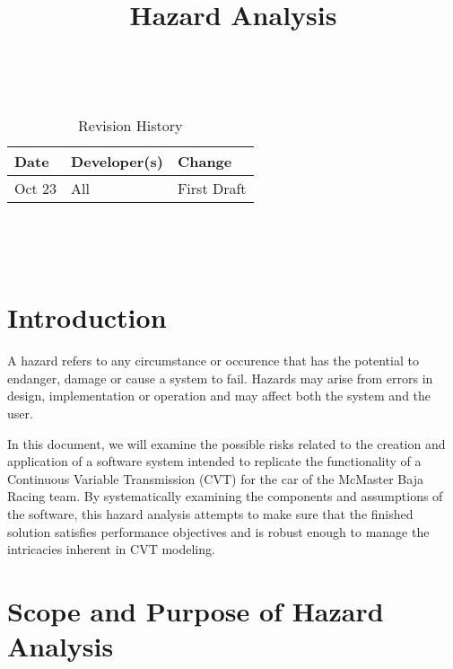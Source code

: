 \documentclass{article}
\title{Hazard Analysis\\\progname}
\author{\authname}
\date{}
\begin{document}
\maketitle
\thispagestyle{empty}

~\newpage


\begin{table}[hp]
\caption{Revision History} \label{TblRevisionHistory}
\begin{tabularx}{\textwidth}{llX}
\toprule
\textbf{Date} & \textbf{Developer(s)} & \textbf{Change}\\
\midrule
Oct 23 & All & First Draft\\
\bottomrule
\end{tabularx}
\end{table}

~\newpage

\tableofcontents

~\newpage


\section{Introduction}

A hazard refers to any circumstance or occurence that has the potential to endanger, damage or cause a system to fail. Hazards may arise from errors in design, implementation or operation and may affect both the system and the user.

In this document, we will examine the possible risks related to the creation and application of a software system intended to replicate the functionality of a Continuous Variable Transmission (CVT) for the car of the McMaster Baja Racing team. By systematically examining the components and assumptions of the software, this hazard analysis attempts to make sure that the finished solution satisfies performance objectives and is robust enough to manage the intricacies inherent in CVT modeling.

\section{Scope and Purpose of Hazard Analysis}
\end{document}
